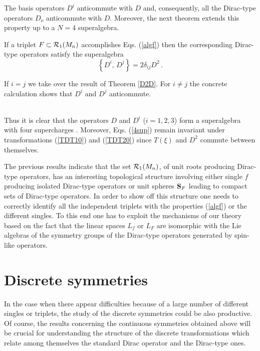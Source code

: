 \documentclass[a4paper,12pt]{article}
\begin{document}
The basis operators $D^i$ anticommute with $D$ and, consequently, all the 
Dirac-type operators $D_{\nu}$ anticommute with $D$. Moreover, the next 
theorem extends this property up to a $N=4$ superalgebra. 
\begin{theor}
If a triplet $F\subset {\cal R}_1(M_n)$ accomplishes  Eqs. (\ref{algf}) then 
the corresponding Dirac-type operators satisfy the superalgebra
\begin{equation}\label{4sup}
\left\{D^i,\,D^j\right\}=2\delta_{ij} D^2\,. 
\end{equation}
\end{theor}
\begin{demo}
If $i=j$ we take over the result of Theorem \ref{D2D}. For $i\not=j$ the 
concrete calculation shows that $D^i$ and $D^j$ anticommute. 
 \end{demo}\\
Thus it is clear that the operators $D$ and $D^i$ ($i=1,2,3$) form a 
superalgebra with four supercharges \cite{CV}. Moreover, Eqs. (\ref{4sup}) 
remain invariant under transformations (\ref{TDT10}) and (\ref{TDT20}) 
since $T(\xi)$ and $D^2$ commute between themselves. 

The previous results indicate that the set ${\cal R}_1(M_n)$, of unit roots 
producing Dirac-type operators, has an interesting topological structure 
involving either single $f$  producing 
isolated  Dirac-type operators  or unit spheres  ${\bf S}_{F}$ leading to 
compact sets of Dirac-type operators. In order to show off this structure one 
needs to correctly identify all the independent triplets with the properties 
(\ref{algf}) or the different singles. To this end one has to exploit 
the mechanisms of our theory based on the fact that the linear spaces $L_f$ or 
$L_F$ are isomorphic with the Lie algebras of the symmetry  groups of the  
Dirac-type operators generated by spin-like operators.

\section{Discrete symmetries}

In the case when there appear difficulties because of a large number of 
different singles or triplets, the  study of the discrete symmetries could 
be also productive. Of course, the results concerning the continuous symmetries 
obtained above will be crucial for understanding the structure of the discrete 
transformations which relate among themselves the standard Dirac operator and 
the Dirac-type ones.
\end{document}
